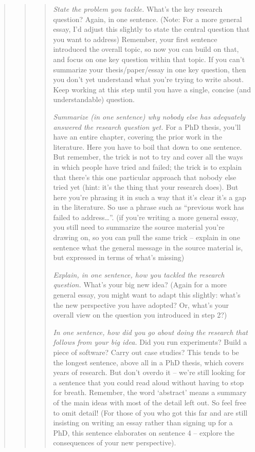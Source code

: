 {{\begin{abstract}
\begin{abstract}
\begin{abstract}
\emph{State the problem you tackle.}
What’s the key research question?
Again, in one sentence.
(Note: For a more general essay, I’d adjust this slightly to state the central question that you want to address)
Remember, your first sentence introduced the overall topic, so now you can build on that, and focus on one key question within that topic.
If you can’t summarize your thesis/paper/essay in one key question, then you don’t yet understand what you’re trying to write about.
Keep working at this step until you have a single, concise (and understandable) question.

\emph{Summarize (in one sentence) why nobody else has adequately answered the research question yet.}
For a PhD thesis, you’ll have an entire chapter, covering the prior work in the literature.
Here you have to boil that down to one sentence.
But remember, the trick is not to try and cover all the ways in which people have tried and failed; the trick is to explain that there’s this one particular approach that nobody else tried yet (hint: it’s the thing that your research does).
But here you’re phrasing it in such a way that it’s clear it’s a gap in the literature.
So use a phrase such as “previous work has failed to address…”.
(if you’re writing a more general essay, you still need to summarize the source material you’re drawing on, so you can pull the same trick – explain in one sentence what the general message in the source material is, but expressed in terms of what’s missing)

\emph{Explain, in one sentence, how you tackled the research question.}
What’s your big new idea?
(Again for a more general essay, you might want to adapt this slightly: what’s the new perspective you have adopted?
Or, what’s your overall view on the question you introduced in step 2?)

\emph{In one sentence, how did you go about doing the research that follows from your big idea.}
Did you run experiments?
Build a piece of software?
Carry out case studies?
This tends to be the longest sentence, above all in a PhD thesis, which covers years of research.
But don’t overdo it – we’re still looking for a sentence that you could read aloud without having to stop for breath.
Remember, the word ‘abstract’ means a summary of the main ideas with most of the detail left out.
So feel free to omit detail!
(For those of you who got this far and are still insisting on writing an essay rather than signing up for a PhD, this sentence elaborates on sentence 4 – explore the consequences of your new perspective).


\end{abstract}
\end{abstract}
\end{abstract}}}
